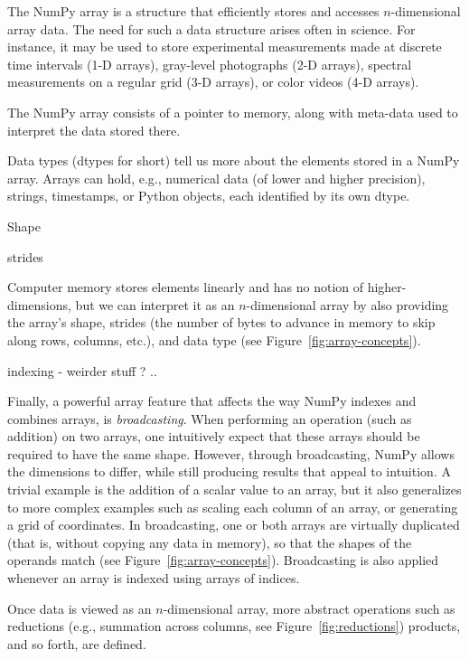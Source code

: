 The NumPy array is a structure that efficiently stores and accesses
$n$-dimensional array data\cite{vanderwalt2011numpy}.
The need for such a data structure arises often in science.
For instance, it may be used to store experimental measurements made at
discrete time intervals (1-D arrays), gray-level photographs (2-D arrays),
spectral measurements on a regular grid (3-D arrays), or color videos (4-D
arrays).

The NumPy array consists of a pointer to memory, along with meta-data used to
interpret the data stored there.

Data types (dtypes for short) tell us more about the elements stored in a NumPy
array.
Arrays can hold, e.g., numerical data (of lower and higher precision), strings,
timestamps, or Python objects, each identified by its own dtype.

Shape 

strides

Computer memory stores elements linearly and has no notion
of higher-dimensions, but we can interpret it as an $n$-dimensional array by also
providing the array's shape, strides (the number of bytes to advance in memory to skip
along rows, columns, etc.), and data type (see Figure~\ref{fig:array-concepts}).


indexing - weirder stuff ? ..


Finally, a powerful array feature that affects the way NumPy indexes and combines arrays, is {\em broadcasting}. When performing an operation (such as addition) on two arrays, one intuitively expect that these arrays should be required to have the same shape.  However, through broadcasting, NumPy allows the dimensions to differ, while still producing results that appeal to intuition.  A trivial example is the addition of a scalar value to an array, but it also generalizes to more complex examples such as scaling each column of an array, or generating a grid of coordinates.  In broadcasting, one or both arrays are virtually duplicated (that is, without copying any data in memory), so that the shapes of the operands match (see Figure~\ref{fig:array-concepts}).  Broadcasting is also applied whenever an array is indexed using arrays of indices.%



Once data is viewed as an $n$-dimensional array, more abstract operations such
as reductions (e.g., summation across columns, see Figure~\ref{fig:reductions}) products, and so forth, are
defined.

